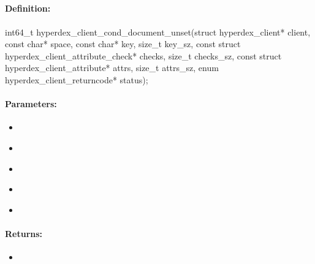 \pagebreak
\subsection{}
\label{api:c:cond_document_unset}


\paragraph{Definition:}
\begin{ccode}
int64_t hyperdex_client_cond_document_unset(struct hyperdex_client* client,
        const char* space,
        const char* key, size_t key_sz,
        const struct hyperdex_client_attribute_check* checks, size_t checks_sz,
        const struct hyperdex_client_attribute* attrs, size_t attrs_sz,
        enum hyperdex_client_returncode* status);
\end{ccode}

\paragraph{Parameters:}
\begin{itemize}[noitemsep]
\item {}\\

\item {}\\

\item {}\\

\item {}\\

\item {}\\

\end{itemize}

\paragraph{Returns:}
\begin{itemize}[noitemsep]
\item {}\\

\end{itemize}

